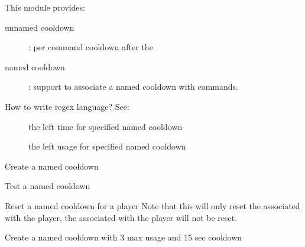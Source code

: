 \label{ch:command_cooldown}

This module provides:

\begin{description}
    \item [unnamed cooldown]: {per command cooldown after the }
    \item [named cooldown]: {support to associate a named cooldown with commands.}
\end{description}

\begin{tips}{How to write regex language?}
    See:~
\end{tips}


\begin{description}
    \item [] the left time for specified named cooldown
    \item [] the left usage for specified named cooldown
\end{description}


\begin{example}{Create a named cooldown}
\end{example}

\begin{example}{Test a named cooldown}
\end{example}

\begin{example}{Reset a named cooldown for a player}
    Note that this will only reset the  associated with the player, the  associated with the player will not be reset.\\
\end{example}

\begin{example}{Create a named cooldown with 3 max usage and 15 sec cooldown}
\end{example}

